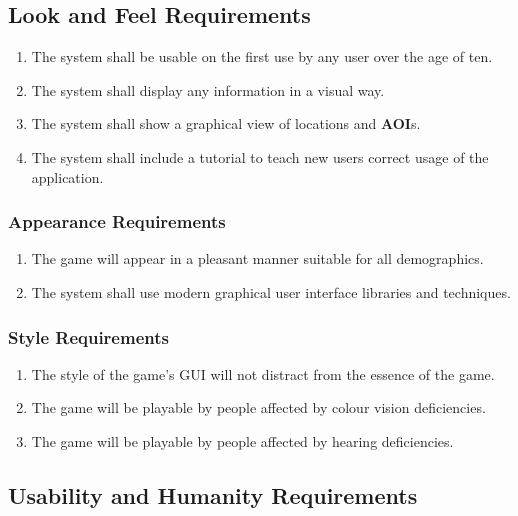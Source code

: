 \documentclass[titlepage]{article}
\begin{document}
		
		\subsection{Look and Feel Requirements}
		\label{sub:look_and_feel_requirements}
		\begin{enumerate}
			\item
			The system shall be usable on the first use by any user over the age of ten.
			\item
			The system shall display any information in a visual way. %
			\item
			The system shall show a graphical view of locations and \textbf{AOI}s.
			\item
			The system shall include a tutorial to teach new users correct usage of the application.
		\end{enumerate}
		
		\subsubsection{Appearance Requirements}
		\label{ssub:appearance_requirements}
		\begin{enumerate}[{LF}1. ]
			\item 
			The game will appear in a pleasant manner suitable for all demographics.
			\item
			The system shall use modern graphical user interface libraries and techniques.
		\end{enumerate}
		
		\subsubsection{Style Requirements}
		\label{ssub:style_requirements}
		\begin{enumerate}[{LF}1. ]
			\item 
			The style of the game's GUI will not distract from the essence of the game.
			\item
			The game will be playable by people affected by colour vision deficiencies.
			\item
			The game will be playable by people affected by hearing deficiencies.
		\end{enumerate}
		
		
		\subsection{Usability and Humanity Requirements}
		\label{sub:usability_and_humanity_requirements}
		
\end{document}

